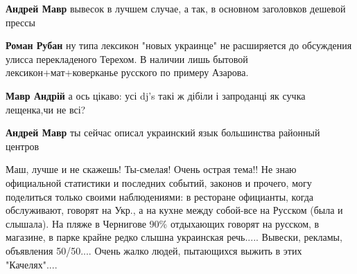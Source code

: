 \begin{itemize}
\begin{itemize}
 
\textbf{Андрей Мавр} вывесок в лучшем случае, а так, в основном заголовков дешевой прессы

 
\textbf{Роман Рубан} ну типа лексикон "новых украинце" не расширяется до обсуждения улисса перекладеного Терехом. В наличии лишь бытовой лексикон+мат+коверканье русского по примеру Азарова.

 
\textbf{Мавр Андрій} а ось цікаво: усі dj's такі ж дібіли і запроданці як сучка лещенка,чи не всі?

 
\textbf{Андрей Мавр} ты сейчас описал украинский язык большинства районный центров
\end{itemize}

 

Маш, лучше и не скажешь! Ты-смелая! Очень острая тема!! Не знаю официальной
статистики и последних событий, законов и прочего, могу поделиться только своими
наблюдениями: в ресторане официанты, когда обслуживают, говорят на Укр., а на
кухне между собой-все на Русском (была и слышала). На пляже в Чернигове 90\%
отдыхающих говорят на русском, в магазине, в парке крайне редко слышна украинская
речь..... Вывески, рекламы, объявления 50/50.... Очень жалко людей, пытающихся
выжить в этих "Качелях"....


\end{itemize}
